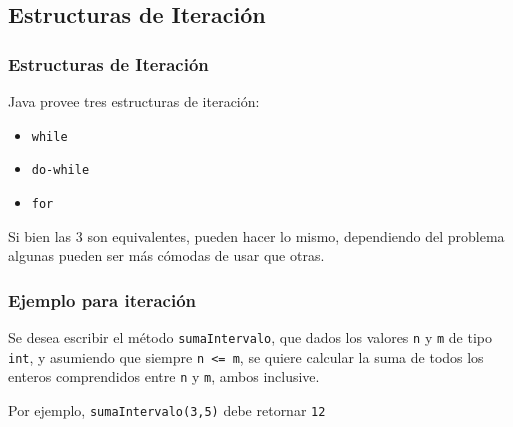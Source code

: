 \documentclass{beamer}
\newcommand{\code}[1]{\texttt{#1}}
\begin{document}
\subsection{Estructuras de Iteración}

\begin{frame}
  \frametitle{Estructuras de Iteración}

  Java provee tres estructuras de iteración:
  
  \begin{itemize}
  \item \code{while}
  \item \code{do-while}
  \item	\code{for}
  \end{itemize}

  Si bien las 3 son equivalentes, pueden hacer lo mismo, dependiendo
  del problema algunas pueden ser más cómodas de usar que otras.
  
\end{frame}

\begin{frame}
  \frametitle{Ejemplo para iteración}

  \begin{block}{}
    Se desea escribir el método \code{sumaIntervalo}, que dados los
    valores \code{n} y \code{m} de tipo \code{int}, y asumiendo que
    siempre \code{n <= m}, se quiere calcular la suma de todos los
    enteros comprendidos entre \code{n} y \code{m}, ambos inclusive.
\end{block}

\begin{exampleblock}{}
  Por ejemplo, \code{sumaIntervalo(3,5)} debe retornar \code{12}  
\end{exampleblock}

\end{frame}
\end{document}

